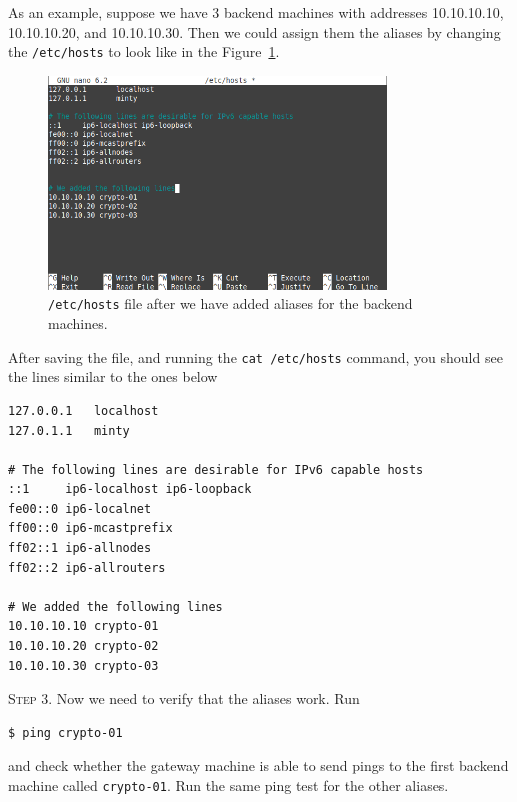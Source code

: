 \documentclass{article}
\begin{document}
As an example, suppose we have 3 backend machines with addresses 10.10.10.10, 10.10.10.20, and 10.10.10.30. Then we could assign them the aliases by changing the \texttt{/etc/hosts} to look like in the Figure~\ref{fig:3}.
\begin{figure}[!h]
    \centering
    \includegraphics[width=0.8\textwidth]{nano-2}
    \caption{\texttt{/etc/hosts} file after we have added aliases for the backend machines.}
    \label{fig:3}
\end{figure}

After saving the file, and running the \texttt{cat /etc/hosts} command, you should see the lines similar to the ones below
\begin{lstlisting}
127.0.0.1	localhost
127.0.1.1	minty

# The following lines are desirable for IPv6 capable hosts
::1     ip6-localhost ip6-loopback
fe00::0 ip6-localnet
ff00::0 ip6-mcastprefix
ff02::1 ip6-allnodes
ff02::2 ip6-allrouters

# We added the following lines
10.10.10.10 crypto-01
10.10.10.20 crypto-02
10.10.10.30 crypto-03
\end{lstlisting}

\vspace{0.5cm}

\textsc{Step 3}. Now we need to verify that the aliases work. Run
\begin{lstlisting}[language=bash]
$ ping crypto-01
\end{lstlisting}
and check whether the gateway machine is able to send pings to the first backend machine called \texttt{crypto-01}. Run the same ping test for the other aliases.

\vspace{0.5cm} 
\end{document}
